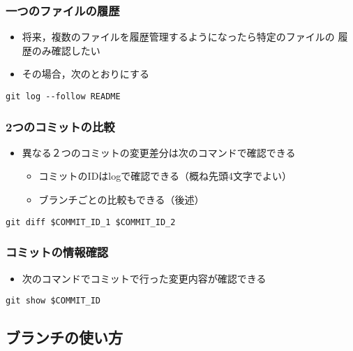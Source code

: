 \documentclass[a4paper,twoside,twocolumn]{bxjsarticle}
\begin{document}
\subsubsection{一つのファイルの履歴}
\label{sec-1-5-2}
\begin{itemize}
\item 将来，複数のファイルを履歴管理するようになったら特定のファイルの
履歴のみ確認したい
\item その場合，次のとおりにする
\end{itemize}

\begin{verbatim}
git log --follow README
\end{verbatim}

\subsubsection{2つのコミットの比較}
\label{sec-1-5-3}
\begin{itemize}
\item 異なる２つのコミットの変更差分は次のコマンドで確認できる
\begin{itemize}
\item コミットのIDはlogで確認できる（概ね先頭4文字でよい）
\item ブランチごとの比較もできる（後述）
\end{itemize}
\end{itemize}

\begin{verbatim}
git diff $COMMIT_ID_1 $COMMIT_ID_2
\end{verbatim}

\subsubsection{コミットの情報確認}
\label{sec-1-5-4}
\begin{itemize}
\item 次のコマンドでコミットで行った変更内容が確認できる
\end{itemize}

\begin{verbatim}
git show $COMMIT_ID
\end{verbatim}

\subsection{ブランチの使い方}
\label{sec-1-6}
\end{document}

